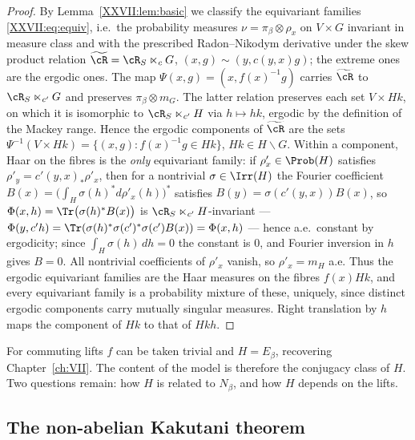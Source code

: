 \begin{proof}
By Lemma~\ref{XXVII:lem:basic} we classify the equivariant families \eqref{XXVII:eq:equiv}, i.e.\ the
probability measures $\nu=\pi_\beta\otimes\rho_x$ on $V\times G$ invariant in measure class
and with the prescribed Radon--Nikodym derivative under the skew product relation
$\widetilde\cR=\cR_S\ltimes_cG$, $(x,g)\sim(y,c(y,x)g)$; the extreme ones are the ergodic
ones. The map $\Psi(x,g)=(x,f(x)^{-1}g)$ carries $\widetilde\cR$ to $\cR_S\ltimes_{c'}G$ and
preserves $\pi_\beta\otimes m_G$. The latter relation preserves each set $V\times Hk$, on which
it is isomorphic to $\cR_S\ltimes_{c'}H$ via $h\mapsto hk$, ergodic by the definition of the
Mackey range. Hence the ergodic components of $\widetilde\cR$ are the sets
$\Psi^{-1}(V\times Hk)=\{(x,g):f(x)^{-1}g\in Hk\}$, $Hk\in H\backslash G$. Within a
component, Haar on the fibres is the \emph{only} equivariant family: if
$\rho'_x\in\Prob(H)$ satisfies $\rho'_y=c'(y,x)_*\rho'_x$, then for a nontrivial
$\sigma\in\Irr(H)$ the Fourier coefficient $B(x)=\bigl(\int_H\sigma(h)^*d\rho'_x(h)\bigr)^*$
satisfies $B(y)=\sigma(c'(y,x))B(x)$, so $\Phi(x,h)=\Tr\bigl(\sigma(h)^*B(x)\bigr)$ is
$\cR_S\ltimes_{c'}H$-invariant --- $\Phi(y,c'h)=\Tr(\sigma(h)^*\sigma(c')^*\sigma(c')B(x))=\Phi(x,h)$
--- hence a.e.\ constant by ergodicity; since $\int_H\sigma(h)\,dh=0$ the constant is $0$,
and Fourier inversion in $h$ gives $B=0$. All nontrivial coefficients of $\rho'_x$ vanish,
so $\rho'_x=m_H$ a.e. Thus the ergodic
equivariant families are the Haar measures on the fibres $f(x)Hk$, and every equivariant
family is a probability mixture of these, uniquely, since distinct ergodic components carry
mutually singular measures. Right translation by $h$ maps the component of $Hk$ to that of
$Hkh$.
\end{proof}

For commuting lifts $f$ can be taken trivial and $H=E_\beta$, recovering Chapter~\ref{ch:VII}. The
content of the model is therefore the conjugacy class of $H$. Two questions remain: how
$H$ is related to $N_\beta$, and how $H$ depends on the lifts.

\subsection{The non-abelian Kakutani theorem}

